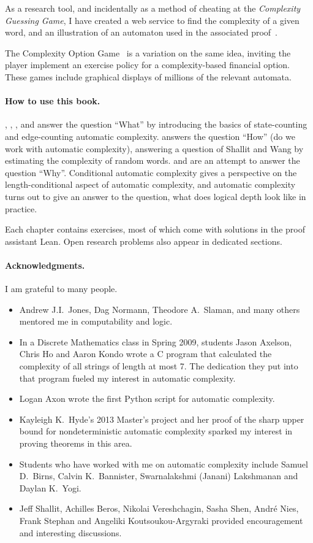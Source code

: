 	As a research tool, and incidentally as a method of cheating at the \emph{Complexity Guessing Game},
	I have created a web service to find the complexity of a given word, and an illustration of an automaton used in the associated proof~\cite{lookup}.

	The Complexity Option Game~\cite{COG} is a variation on the same idea, inviting the player implement an exercise policy for a complexity-based financial option.
	These games include graphical displays of millions of the relevant automata.

	\paragraph*{How to use this book.}
	, , , and  answer the question ``What''
	by introducing the basics of state-counting and edge-counting automatic complexity.
	 answers the question ``How'' (do we work with automatic complexity), answering a question of Shallit and Wang by estimating the complexity of random words.
	 and  are an attempt to answer the question ``Why''.
	Conditional automatic complexity gives a perspective on the length-conditional aspect of automatic complexity, and
	automatic complexity turns out to give an answer to the question, what does logical depth look like in practice.
	
	Each chapter contains exercises, most of which come with solutions in the proof assistant Lean. Open research problems also appear in dedicated sections.


	\paragraph*{Acknowledgments.}
	I am grateful to many people.
	\begin{itemize}
		\item Andrew J.I.~Jones, Dag Normann, Theodore A.~Slaman, and many others mentored me in computability and logic.
		\item In a Discrete Mathematics class in Spring 2009, students
			Jason Axelson, Chris Ho and Aaron Kondo wrote a C program that calculated the complexity of all strings of length at most 7.
			The dedication they put into that program fueled my interest in automatic complexity.
		\item Logan Axon wrote the first Python script for automatic complexity.
		\item Kayleigh K.~Hyde's 2013 Master's project and
			her proof of the sharp upper bound for nondeterministic automatic complexity sparked my interest in proving theorems in this area.
		\item Students who have worked with me on automatic complexity include Samuel D.~Birns, Calvin K.~Bannister, Swarnalakshmi (Janani) Lakshmanan and Daylan K.~Yogi.
		\item Jeff Shallit, Achilles Beros, Nikolai Vereshchagin, Sasha Shen, Andr\'e Nies, Frank Stephan and Angeliki Koutsoukou-Argyraki
			provided encouragement and interesting discussions.
	\end{itemize}

